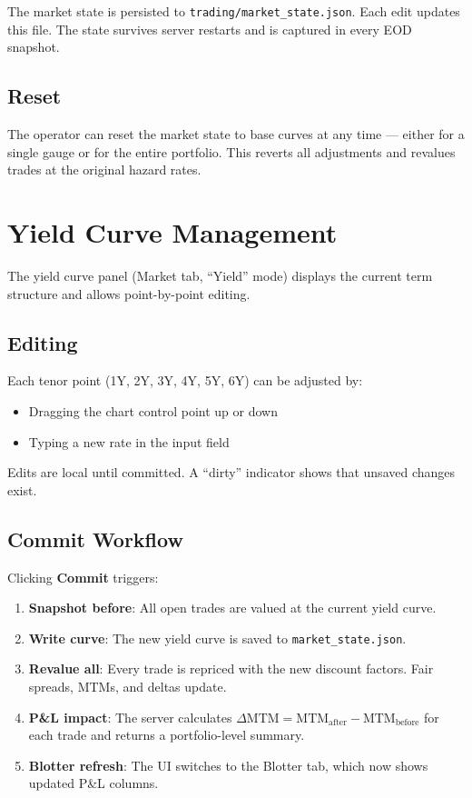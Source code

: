 \documentclass[11pt,a4paper]{article}
\begin{document}
The market state is persisted to \texttt{trading/market\_state.json}.
Each edit updates this file.  The state survives server restarts and
is captured in every EOD snapshot.

\subsection{Reset}

The operator can reset the market state to base curves at any time ---
either for a single gauge or for the entire portfolio.  This reverts
all adjustments and revalues trades at the original hazard rates.


\section{Yield Curve Management}

The yield curve panel (Market tab, ``Yield'' mode) displays the current
term structure and allows point-by-point editing.

\subsection{Editing}

Each tenor point (1Y, 2Y, 3Y, 4Y, 5Y, 6Y) can be adjusted by:
\begin{itemize}
  \item Dragging the chart control point up or down
  \item Typing a new rate in the input field
\end{itemize}

\noindent Edits are local until committed.  A ``dirty'' indicator shows
that unsaved changes exist.

\subsection{Commit Workflow}

Clicking \textbf{Commit} triggers:
\begin{enumerate}
  \item \textbf{Snapshot before}: All open trades are valued at the
        current yield curve.
  \item \textbf{Write curve}: The new yield curve is saved to
        \texttt{market\_state.json}.
  \item \textbf{Revalue all}: Every trade is repriced with the new
        discount factors.  Fair spreads, MTMs, and deltas update.
  \item \textbf{P\&L impact}: The server calculates
        $\Delta\text{MTM} = \text{MTM}_{\text{after}} - \text{MTM}_{\text{before}}$
        for each trade and returns a portfolio-level summary.
  \item \textbf{Blotter refresh}: The UI switches to the Blotter tab,
        which now shows updated P\&L columns.
\end{enumerate}
\end{document}
